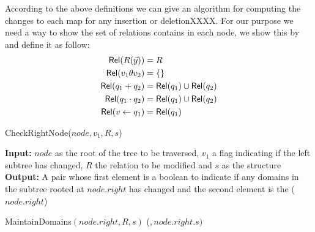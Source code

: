 \documentclass[12pt]{article}
\begin{document}
According to the above definitions we can give an algorithm for computing the changes to each map for any insertion or deletionXXXX. For our purpose we need a way to show the set of relations contains in each node, we show this by \Rel{} and define it as follow:
\begin{align}
\text{\textsf{Rel}}(R(\vec{y}))&=R\\
\text{\textsf{Rel}}(v_{1}\theta v_{2})&=\{\}\\
\text{\textsf{Rel}}(q_{1}+q_{2})&=\text{\textsf{Rel}}(q_{1})\cup\text{\textsf{Rel}}(q_{2})\\
\text{\textsf{Rel}}(q_{1}\cdot q_{2})&=\text{\textsf{Rel}}(q_{1})\cup\text{\textsf{Rel}}(q_{2})\\
\text{\textsf{Rel}}(v\gets q_{1})&=\text{\textsf{Rel}}(q_{1})
\end{align}

\begin{algorithm}
\caption{CheckRightNode($node,v_{1},R,s$)}
\label{alg:sub}
\textbf{Input:} $node$ as the root of the tree to be traversed, $v_{1}$ a flag indicating if the left subtree has changed, $R$ the relation to be modified and $s$ as the structure \\
\textbf{Output:} A pair whose first element is a boolean to indicate if any domains in the subtree rooted at $node.right$ has changed
and the second element is the \dom($node.right$)
\begin{algorithmic}[1]
\RETURN MaintainDomains$(node.right,R,s)$
\ELSE
\RETURN (\FALSE$,node.right.s)$
\ENDIF
\end{algorithmic}
\end{algorithm}
\end{document}
